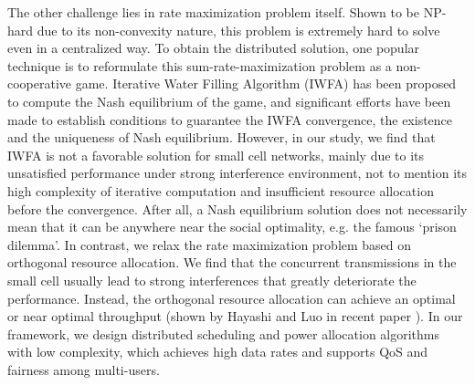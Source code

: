 \documentclass[conference]{IEEEtran}
\begin{document}
The other challenge lies in rate maximization problem itself. Shown to be NP-hard\cite{luo2008dynamic} due to its non-convexity nature, this problem is extremely hard to solve even in a centralized way. To obtain the distributed solution, one popular technique is to reformulate this sum-rate-maximization problem as a non-cooperative game. Iterative Water Filling Algorithm (IWFA)\cite{yu2002distributed} has been proposed to compute the Nash equilibrium of the game, and significant efforts \cite{yu2002distributed,scutari2008optimal, luo2006analysis} have been made to establish conditions to guarantee the IWFA convergence, the existence and the uniqueness of Nash equilibrium. However, in our study, we find that IWFA is not a favorable solution for small cell networks, mainly due to its unsatisfied performance under strong interference environment, not to mention its high complexity of iterative computation and insufficient resource allocation before the convergence. After all, a Nash equilibrium solution does not necessarily mean that it can be anywhere near the social optimality, e.g. the famous  `prison dilemma'.
In contrast, we relax the rate maximization problem based on orthogonal resource allocation. We find that the concurrent transmissions in the small cell usually lead to strong interferences that greatly deteriorate the performance. Instead, the orthogonal resource allocation can achieve an optimal or near optimal throughput (shown by Hayashi and Luo in recent paper \cite{hayashi2009spectrum}). In our framework, we design distributed scheduling and power allocation algorithms with low complexity, which achieves high data rates and supports QoS and fairness among multi-users.
\end{document}
